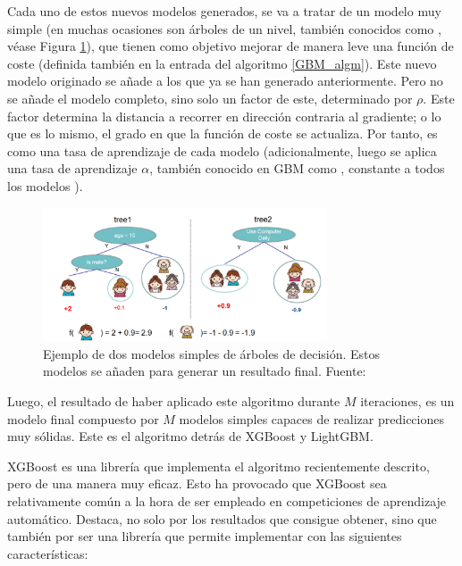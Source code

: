 {Cada uno de estos nuevos modelos generados, se va a tratar de un modelo muy simple (en muchas ocasiones son árboles de un nivel, también conocidos como , véase Figura \ref{simple_gbm_tree}), que tienen como objetivo mejorar de manera leve una función de coste (definida también en la entrada del algoritmo  \ref{GBM_algm}). Este nuevo modelo originado se añade a los que ya se han generado anteriormente. Pero no se añade el modelo completo, sino solo un factor de este, determinado por $\rho$. Este factor determina la distancia a recorrer en dirección contraria al gradiente; o lo que es lo mismo, el grado en que la función de coste se actualiza. Por tanto, es como una tasa de aprendizaje de cada modelo (adicionalmente, luego se aplica una tasa de aprendizaje $\alpha$, también conocido en GBM como , constante a todos los modelos \parencite{GBM}).

\begin{figure}[H]
    \centering
    \includegraphics[width = 0.75\textwidth]{imgs/simple_gbm_tree.png}
    \caption{Ejemplo de dos modelos simples de árboles de decisión. Estos modelos se añaden para generar un resultado final. \scriptsize{Fuente: \parencite{XGBoost}}}
    \label{simple_gbm_tree}
\end{figure}
Luego, el resultado de haber aplicado este algoritmo durante $M$ iteraciones, es un modelo final compuesto por $M$ modelos simples capaces de realizar predicciones muy sólidas. Este es el algoritmo detrás de XGBoost y LightGBM. 

\bigskip

\bigskip


XGBoost \parencite{XGBoost} es una librería que implementa el algoritmo recientemente descrito, pero de una manera muy eficaz. Esto ha provocado que XGBoost sea relativamente común a la hora de ser empleado en competiciones de aprendizaje automático\fnm. Destaca, no solo por los resultados que consigue obtener, sino que también por ser una librería que permite implementar  con las siguientes características:

}
